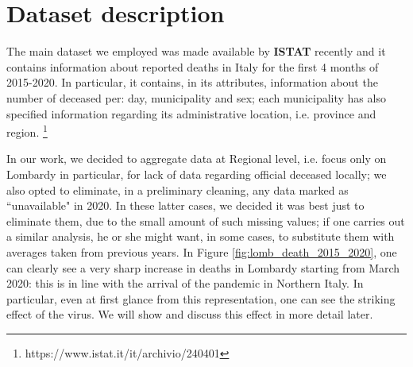 \documentclass[11pt,a4paper,final]{paper}
\begin{document}
\section{Dataset description}\label{sec:descr}
The main dataset we employed was made available by \textbf{ISTAT} recently and it contains information about reported deaths in Italy for the first 4 months of 2015-2020. In particular, it contains, in its attributes, information about the number of deceased per: day, municipality and sex; each municipality has also specified information regarding its administrative location, i.e. province and region. 
\footnote{https://www.istat.it/it/archivio/240401} 

In our work, we decided to aggregate data at Regional level, i.e. focus only on Lombardy in particular, for lack of data regarding official deceased locally; we also opted to eliminate, in a preliminary cleaning, any data marked as ``unavailable" in 2020. In these latter cases, we decided it was best just to eliminate them, due to the small amount of such missing values; if one carries out a similar analysis, he or she might want, in some cases, to substitute them with averages taken from previous years.
In Figure \ref{fig:lomb_death_2015_2020}, one can clearly see a very sharp increase in deaths in Lombardy starting from March 2020: this is in line with the arrival of the pandemic in Northern Italy. In particular, even at first glance from this representation, one can see the striking effect of the virus. We will show and discuss this effect in more detail later.
\end{document}
